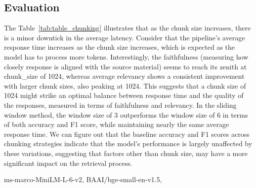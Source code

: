 \subsection{Evaluation}\label{subsec:evaluation}
The Table~\ref{tab:table_chunking} illustrates that as the chunk size increases, there is a minor downtick in the average latency.
Consider that the pipeline's average response time increases as the chunk size increases, which is expected as the model has to process more tokens.
Interestingly, the faithfulness (\ie measuring how closely response is aligned with the source material) seems to reach its zenith at chunk\_size of 1024, whereas average relevancy shows a consistent improvement with larger chunk sizes, also peaking at 1024.
This suggests that a chunk size of 1024 might strike an optimal balance between response time and the quality of the responses, measured in terms of faithfulness and relevancy.
In the sliding window method, the window size of 3 outperforms the window size of 6 in terms of both accuracy and F1 score, while maintaining nearly the same average response time.
We can figure out that the baseline accuracy and F1 scores across chunking strategies indicate that the model’s performance is largely unaffected by these variations, suggesting that factors other than chunk size, may have a more significant impact on the retrieval process.
\begin{table}[h!]
    \centering
    \noindent
    \caption{Performance evaluation of various chunking strategy on the FactBench dataset, using the Gemma2 model.}
    {\scriptsize ms-marco-MiniLM-L-6-v2, BAAI/bge-small-en-v1.5,}\\
    \label{tab:table_chunking}
\end{table}

